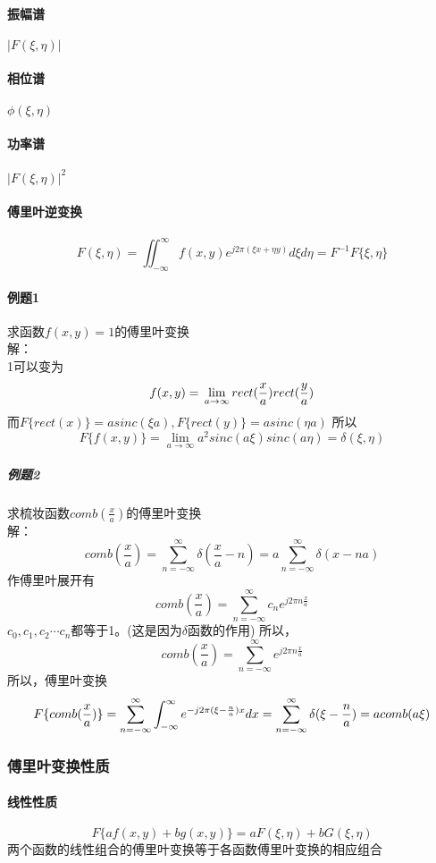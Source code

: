\documentclass[UTF8]{ctexart}
\newcommand{\f}[2]{\frac{#1}{#2}}%
\newcommand{\sumsum}[3]{\sum_{#1=#2}^#3}
\begin{document}
\paragraph{振幅谱}$|F(\xi,\eta)|$
\paragraph{相位谱}$\phi(\xi,\eta)$
\paragraph{功率谱}$|F(\xi,\eta)|^2$
\paragraph{傅里叶逆变换}\[F(\xi,\eta)=\iint_{-\infty}^{\infty}f(x,y)e^{j2\pi(\xi x+\eta y)}d\xi d\eta=F^{-1} {F\{\xi,\eta\}}\]
\paragraph{例题1}求函数$f(x,y)=1$的傅里叶变换\\解：\\
1可以变为\[f(x,y)=\\
\lim\limits_{a \to \infty}rect(\f{x}{a})rect(\f{y}{a})\]
而$F\{rect(x)\}=asinc(\xi a),F\{rect(y)\}=asinc(\eta a)$
所以\[ F\{f(x,y)\}=\lim\limits_{a \to \infty}a^2sinc(a\xi)sinc(a\eta)=\delta(\xi,\eta)
\]
\subparagraph{例题2}求梳妆函数$comb(\f{x}{a})$的傅里叶变换
\\解：\[comb(\f{x}{a})=\sumsum{n}{-\infty}{\infty}\delta(\f{x}{a}-n)=a\sumsum{n}{-\infty}{\infty}\delta(x-na)\]
作傅里叶展开有\[
   comb(\f{x}{a})=\sumsum{n}{-\infty}{\infty}c_{n}e^{j2\pi n\f{x}{a}} \]
$c_{0},c_{1},c_{2}\cdots c_{n}$都等于1。(这是因为$\delta$函数的作用)
所以，\[
    comb(\f{x}{a})=\sumsum{n}{-\infty}{\infty}e^{j2\pi n\f{x}{a}}\]
所以，傅里叶变换\[
    F\{comb(\f{x}{a})\}=\sumsum{n}{-\infty}{\infty}\int_{-\infty}^{\infty}e^{-j2\pi(\xi-\f{n}{a})x}dx \\
    =\sumsum{n}{-\infty}{\infty}\delta(\xi-\f{n}{a})=acomb(a\xi)
    \]
\subsubsection{傅里叶变换性质}%
\paragraph{线性性质}
\[
    F\{ af(x,y)+bg(x,y)\}=aF(\xi,\eta)+bG(\xi,\eta)
\]
两个函数的线性组合的傅里叶变换等于各函数傅里叶变换的相应组合
\end{document}
